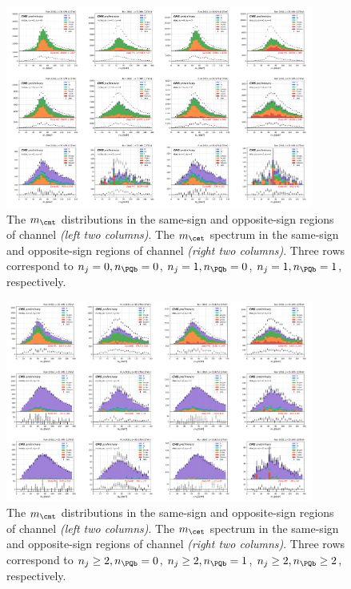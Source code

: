 \begin{figure}
    \centering
    \includegraphics[width=0.9\textwidth]{chapters/Analysis/sectionBackground/figures/ltau_kinematics/ltau1.png}
    \caption{The $m_{\cmt}$ distributions in the same-sign and opposite-sign regions of \cmt channel \emph{(left two columns)}. The $m_{\cet}$ spectrum in the same-sign and opposite-sign regions of \cet channel \emph{(right two columns)}. Three rows correspond to $n_j=0,n_\PQb=0$, $n_j=1,n_\PQb=0$, $n_j=1,n_\PQb=1$, respectively. }
    \label{fig:background:ltau:mass_ltau_1}
\end{figure}
\begin{figure}
    \centering
    \includegraphics[width=0.9\textwidth]{chapters/Analysis/sectionBackground/figures/ltau_kinematics/ltau2.png}
    \caption{The $m_{\cmt}$ distributions in the same-sign and opposite-sign  regions of \cmt channel \emph{(left two columns)}. The $m_{\cet}$ spectrum in the same-sign and opposite-sign regions of \cet channel \emph{(right two columns)}. Three rows correspond to $n_j\geq 2,n_\PQb=0$, $n_j\geq 2,n_\PQb=1$, $n_j\geq 2,n_\PQb\geq 2$, respectively.}
    \label{fig:background:ltau:mass_ltau_2}
\end{figure}




